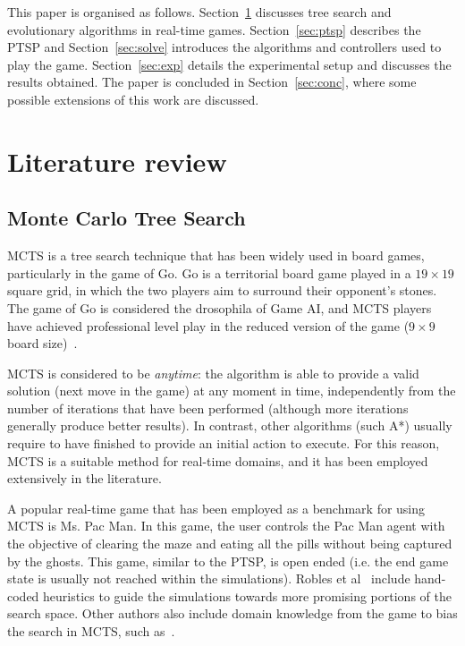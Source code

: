 \documentclass{sig-alternate}
\begin{document}
This paper is organised as follows. Section~\ref{sec:lit} discusses tree search and evolutionary algorithms in real-time games. Section~\ref{sec:ptsp} describes the PTSP and Section~\ref{sec:solve} introduces the algorithms and controllers used to play the game. Section~\ref{sec:exp} details the experimental setup and discusses the results obtained. The paper is concluded in Section~\ref{sec:conc}, where some possible extensions of this work are discussed.

\section{Literature review} \label{sec:lit}

\subsection{Monte Carlo Tree Search}

MCTS is a tree search technique that has been widely used in board games, particularly in the game of Go. Go is a territorial board game played in a $19 \times 19$ square grid, in which the two players aim to surround their opponent's stones. The game of Go is considered the drosophila of Game AI, and MCTS players have achieved professional level play in the reduced version of the game ($9\times9$ board size)~\cite{Lee2009}.

MCTS is considered to be \textit{anytime}: the algorithm is able to provide a valid solution (next move in the game) at any moment in time, independently from the number of iterations that have been performed (although more iterations generally produce better results). In contrast, other algorithms (such A*) usually require to have finished to provide an initial action to execute. For this reason, MCTS is a suitable method for real-time domains, and it has been employed extensively in the literature.

A popular real-time game that has been employed as a benchmark for using MCTS is Ms. Pac Man. In this game, the user controls the Pac Man agent with the objective of clearing the maze and eating all the pills without being captured by the ghosts. This game, similar to the PTSP, is open ended (i.e. the end game state is usually not reached within the simulations). Robles et al~\cite{Robles2009} include hand-coded heuristics to guide the simulations towards more promising portions of the search space. Other authors also include domain knowledge from the game to bias the search in MCTS, such as~\cite{Samothrakis, Ikehata2010}.
\end{document}
